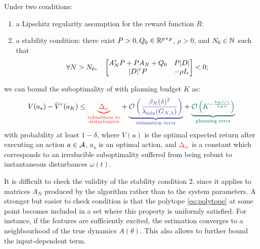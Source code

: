 \documentclass{article}
\begin{document}
\begin{theorem}
	\label{thm:minimax-regret-bound}
		Under two conditions:
		\begin{enumerate}
			\item a Lipschitz regularity assumption for the reward function $R$:
			\item a stability condition: there exist $P>0,Q_0\in\mathbb{R}^{p\times p}$, $\rho>0$, and $N_0\in\mathbb{N}$ such that
			$$\forall N>N_0,\quad \begin{bmatrix}
			A_N^{\mathsf{\scriptscriptstyle T}} P + P A_N + Q_0 & P|D|  \\
			|D|^{\mathsf{\scriptscriptstyle T}} P & -\rho I_r \\
			\end{bmatrix}< 0;$$
		\end{enumerate}
		we can bound the suboptimality of  with planning budget $K$ as:
		\begin{equation*}
		V(a_\star) - \hat{V}^r(a_K) \leq  \hlr{\underbrace{\Delta_\omega}_{\substack{\text{robustness to}\\ \text{disturbances}}}} + \hlb{\underbrace{\cO\left(\frac{\beta_N(\delta)^2}{\lambda_{\min}(G_{N,\lambda})}\right)}_{\text{estimation error}}} + \hlg{\underbrace{\cO\left(K^{-\frac{\log 1/\gamma}{\log \kappa}}\right)}_{\text{planning error}}} 
		\end{equation*}
		with probability at least $1-\delta$, where $V(a)$ is the optimal expected return after executing an action $a\in\mathcal{A}$, $a_\star$ is an optimal action, and $\hlr{\Delta_\omega}$ is a constant which corresponds to an irreducible suboptimality suffered from being robust to instantaneous disturbances $\omega(t)$.
\end{theorem}

It is difficult to check the validity of the stability condition 2. since it applies to matrices $A_N$ produced by the algorithm rather than to the system parameters. A stronger but easier to check condition is that the polytope \eqref{eq:polytope} at some point becomes included in a set where this property is uniformly satisfied. For instance, if the features are sufficiently excited, the estimation converges to a neighbourhood of the true dynamics $A(\theta)$. This also allows to further bound the input-dependent  term.
\end{document}
